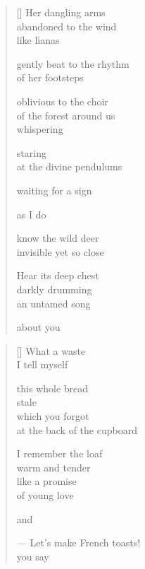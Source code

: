 \documentclass[12pt,a4paper]{article}
\begin{document}
\bigskip

\begin{verse}[\versewidth]
  Her dangling arms \\
  abandoned to the wind \\
  like lianas

  gently beat to the rhythm \\
  of her footsteps

  oblivious to the choir \\
  of the forest around us \\
  whispering

  staring \\
  at the divine pendulums

  waiting for a sign

  as I do

  know the wild deer \\
  invisible yet so close

  Hear its deep chest \\
  darkly drumming \\
  an untamed song

  about you
\end{verse}


\newpage

\poemtitle{}

\settowidth{\versewidth}{--- Let's make French toasts!}

\bigskip

\begin{verse}[\versewidth]
  What a waste \\
  I tell myself

  this whole bread \\
  stale \\
  which you forgot \\
  at the back of the cupboard

  I remember the loaf \\
  warm and tender \\
  like a promise \\
  of young love

  and

  --- Let's make French toasts! \\
  you say
\end{verse}

\end{document}
